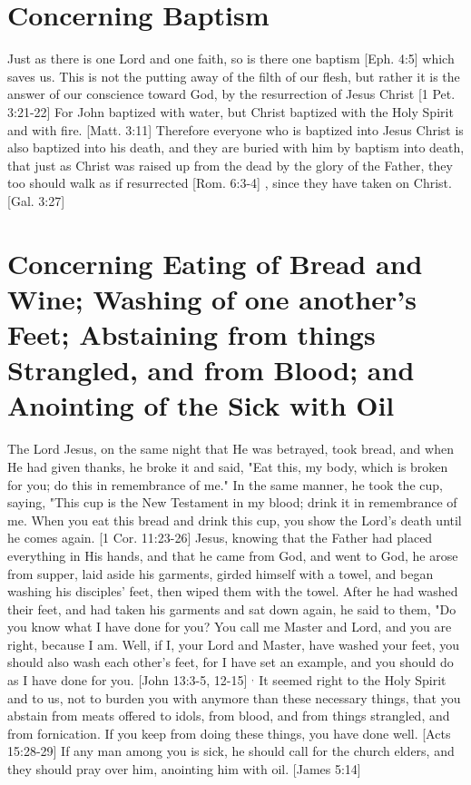 \documentclass[../main.tex] {subfiles}
\begin{document}
	\section{Concerning Baptism}

	Just as there is one Lord and one faith, so is there one baptism [Eph. 4:5]  which saves us. This is not the putting away of the filth of our flesh, but rather it is the answer of our conscience toward God, by the resurrection of Jesus Christ [1 Pet. 3:21-22]  For John baptized with water, but Christ baptized with the Holy Spirit and with fire. [Matt. 3:11]  Therefore everyone who is baptized into Jesus Christ is also baptized into his death, and they are buried with him by baptism into death, that just as Christ was raised up from the dead by the glory of the Father, they too should walk as if resurrected [Rom. 6:3-4] , since they have taken on Christ. [Gal. 3:27] 

	\section{Concerning Eating of Bread and Wine; Washing of one another's Feet; Abstaining from things Strangled, and from Blood; and Anointing of the Sick with Oil}

	The Lord Jesus, on the same night that He was betrayed, took bread, and when He had given thanks, he broke it and said, "Eat this, my body, which is broken for you; do this in remembrance of me." In the same manner, he took the cup, saying, "This cup is the New Testament in my blood; drink it in remembrance of me. When you eat this bread and drink this cup, you show the Lord's death until he comes again. [1 Cor. 11:23-26]  Jesus, knowing that the Father had placed everything in His hands, and that he came from God, and went to God, he arose from supper, laid aside his garments, girded himself with a towel, and began washing his disciples' feet, then wiped them with the towel. After he had washed their feet, and had taken his garments and sat down again, he said to them, "Do you know what I have done for you?  You call me Master and Lord, and you are right, because I am. Well, if I, your Lord and Master, have washed your feet, you should also wash each other's feet, for I have set an example, and you should do as I have done for you. [John 13:3-5, 12-15] $^{,}$ It seemed right to the Holy Spirit and to us, not to burden you with anymore than these necessary things, that you abstain from meats offered to idols, from blood, and from things strangled, and from fornication. If you keep from doing these things, you have done well. [Acts 15:28-29]  If any man among you is sick, he should call for the church elders, and they should pray over him, anointing him with oil. [James 5:14] 
\end{document}
